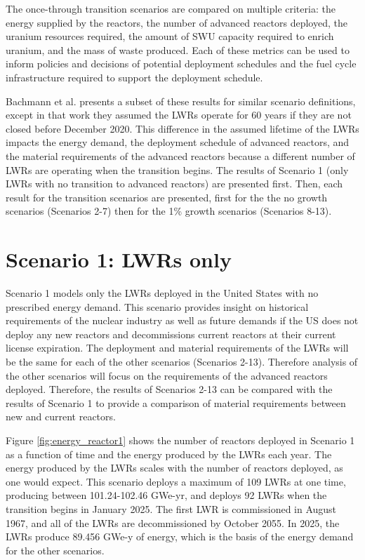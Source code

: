 The once-through transition scenarios are compared on multiple 
criteria: the energy supplied by the reactors, the number of advanced reactors deployed, 
the uranium resources required, the amount of \gls{SWU} capacity required 
to enrich uranium,
and the mass of waste produced. Each of these metrics can be used to inform 
policies and decisions of potential deployment schedules and the 
fuel cycle infrastructure required to support the deployment schedule. 

Bachmann et al. \cite{bachmann_enrichment_2021} presents a subset of 
these results for similar scenario definitions, except in that work 
they assumed the 
\glspl{LWR} operate for 60 years if they are not closed before December 
2020. This difference in 
the assumed lifetime of the \glspl{LWR} impacts the energy demand, 
the deployment schedule of advanced reactors, and the material 
requirements of the advanced reactors because a different number of 
\glspl{LWR} are operating when the transition begins. The results of 
Scenario 1 (only \glspl{LWR} with no transition to advanced reactors) 
are presented first. Then, each result for the transition scenarios are 
presented, first for the the no growth scenarios 
(Scenarios 2-7) then for the 1\% growth scenarios (Scenarios 
8-13).

\section{Scenario 1: LWRs only}\label{sec:scenario1}
Scenario 1 models only the \glspl{LWR} deployed in the United States with no 
prescribed energy demand. This scenario provides insight on historical 
requirements of the nuclear industry as well as future demands if the 
US does not deploy any new reactors and decommissions current reactors at 
their current license expiration. The 
deployment and material requirements of the \glspl{LWR} will be the same 
for each of the other scenarios (Scenarios 2-13). Therefore analysis 
of the other scenarios will focus on the requirements of 
the advanced reactors deployed. Therefore, the results of Scenarios 2-13 
can be compared with the results of Scenario 1 to provide a comparison 
of material requirements between new and current reactors. 

Figure \ref{fig:energy_reactor1} shows the number of 
reactors deployed in Scenario 1 as a function of time and the energy 
produced by the \glspl{LWR} each year. The energy produced by the 
\glspl{LWR} scales with the number of reactors deployed, as 
one would expect. This scenario deploys a maximum of 109 
\glspl{LWR} at one time, producing 
between 101.24-102.46 GWe-yr, and deploys 92 \glspl{LWR}
when the transition begins in January 2025. The first \gls{LWR} is 
commissioned in August 1967, and all of the \glspl{LWR} are
decommissioned by October 2055. In 2025, the \glspl{LWR} produce 
89.456 GWe-y of energy, which is the basis of the energy demand for 
the other scenarios. 

